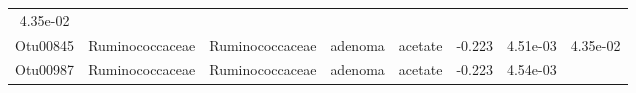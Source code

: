 \documentclass[11pt,]{article}
\begin{document}
\begin{longtable}[]{@{}cccccccc@{}}
\begin{minipage}[t]{0.08\columnwidth}
4.35e-02\strut
\end{minipage}\tabularnewline
\begin{minipage}[t]{0.08\columnwidth}\centering\strut
Otu00845\strut
\end{minipage} & \begin{minipage}[t]{0.15\columnwidth}\centering\strut
Ruminococcaceae\strut
\end{minipage} & \begin{minipage}[t]{0.15\columnwidth}\centering\strut
Ruminococcaceae\strut
\end{minipage} & \begin{minipage}[t]{0.08\columnwidth}\centering\strut
adenoma\strut
\end{minipage} & \begin{minipage}[t]{0.09\columnwidth}\centering\strut
acetate\strut
\end{minipage} & \begin{minipage}[t]{0.07\columnwidth}\centering\strut
-0.223\strut
\end{minipage} & \begin{minipage}[t]{0.08\columnwidth}\centering\strut
4.51e-03\strut
\end{minipage} & \begin{minipage}[t]{0.08\columnwidth}\centering\strut
4.35e-02\strut
\end{minipage}\tabularnewline
\begin{minipage}[t]{0.08\columnwidth}\centering\strut
Otu00987\strut
\end{minipage} & \begin{minipage}[t]{0.15\columnwidth}\centering\strut
Ruminococcaceae\strut
\end{minipage} & \begin{minipage}[t]{0.15\columnwidth}\centering\strut
Ruminococcaceae\strut
\end{minipage} & \begin{minipage}[t]{0.08\columnwidth}\centering\strut
adenoma\strut
\end{minipage} & \begin{minipage}[t]{0.09\columnwidth}\centering\strut
acetate\strut
\end{minipage} & \begin{minipage}[t]{0.07\columnwidth}\centering\strut
-0.223\strut
\end{minipage} & \begin{minipage}[t]{0.08\columnwidth}\centering\strut
4.54e-03\strut
\end{minipage} & \begin{minipage}[t]{0.08\columnwidth}\centering\strut

\end{minipage}
\end{longtable}
\end{document}

